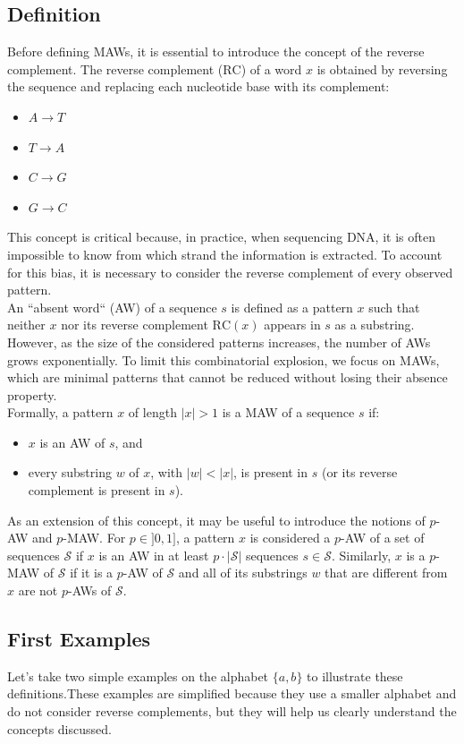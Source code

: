 \documentclass[conference]{IEEEtran}
\begin{document}
\subsection{Definition}
Before defining MAWs, it is essential to introduce the concept of the reverse complement. The reverse complement ($\text{RC}$) of a word $x$ is obtained by reversing the sequence and replacing each nucleotide base with its complement:
\begin{itemize}
\item $A\longrightarrow T$
\item $T \longrightarrow A$
\item $C \longrightarrow G$
\item $G \longrightarrow C$
\end{itemize}
This concept is critical because, in practice, when sequencing DNA, it is often impossible to know from which strand the information is extracted. To account for this bias, it is necessary to consider the reverse complement of every observed pattern.\\
An ``absent word`` (AW) of a sequence $s$ is defined as a pattern $x$ such that neither $x$ nor its reverse complement $\text{RC}(x)$ appears in $s$ as a substring.\\
However, as the size of the considered patterns increases, the number of AWs grows exponentially. To limit this combinatorial explosion, we focus on MAWs, which are minimal patterns that cannot be reduced without losing their absence property.\\
Formally, a pattern $x$ of length $|x| > 1$ is a MAW of a sequence $s$ if:
\begin{itemize}
\item $x$ is an AW of $s$, and
\item every substring $w$ of $x$, with $|w|<|x|$, is present in $s$ (or its reverse complement is present in $s$).
\end{itemize}
As an extension of this concept, it may be useful to introduce the notions of $p$-AW and $p$-MAW. For $p \in ]0, 1]$, a pattern $x$ is considered a $p$-AW of a set of sequences $\mathcal S$ if $x$ is an AW in at least $p \cdot |\mathcal S|$ sequences $s \in \mathcal S$. Similarly, $x$ is a $p$-MAW of $\mathcal S$ if it is a $p$-AW of $\mathcal S$ and all of its substrings $w$ that are different from $x$ are not $p$-AWs of $\mathcal S$.
\subsection{First Examples}
Let’s take two simple examples on the alphabet $\{a, b\}$ to illustrate these definitions.These examples are simplified because they use a smaller alphabet and do not consider reverse complements, but they will help us clearly understand the concepts discussed.
\end{document}
